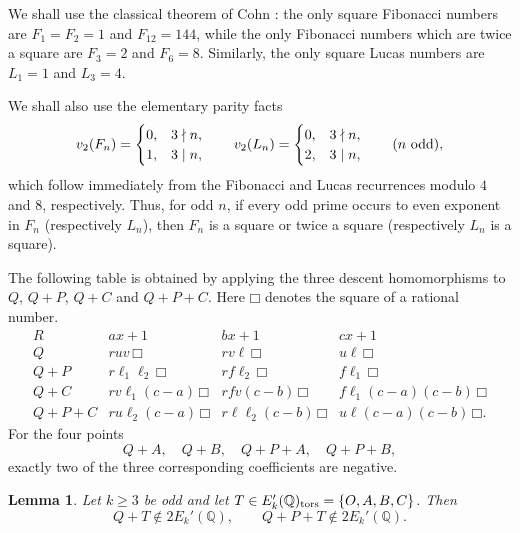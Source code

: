 \documentclass[11pt]{amsart}
\newtheorem{lemma}[theorem]{Lemma}
\theoremstyle{remark}
\newcommand{\Q}{\mathbb{Q}}
\newcommand{\sq}{\mathord{\Box}}
\begin{document}
We shall use the classical theorem of Cohn \cite{Cohn}: the only square
Fibonacci numbers are $F_1=F_2=1$ and $F_{12}=144$, while the only
Fibonacci numbers which are twice a square are $F_3=2$ and $F_6=8$.
Similarly, the only square Lucas numbers are $L_1=1$ and $L_3=4$.

We shall also use the elementary parity facts
\begin{equation}\label{2adic}
 v_2(F_n)=
 \begin{cases}
 0,&3\nmid n,\\
 1,&3\mid n,
 \end{cases}
 \qquad
 v_2(L_n)=
 \begin{cases}
 0,&3\nmid n,\\
 2,&3\mid n,
 \end{cases}
 \qquad (n\ {\rm odd}),
\end{equation}
which follow immediately from the Fibonacci and Lucas recurrences modulo
$4$ and $8$, respectively.  Thus, for odd $n$, if every odd prime occurs
to even exponent in $F_n$ (respectively $L_n$), then $F_n$ is a square
or twice a square (respectively $L_n$ is a square).

The following table is obtained by applying the three descent
homomorphisms to $Q$, $Q+P$, $Q+C$ and $Q+P+C$.  Here $\sq$ denotes
the square of a rational number.
\begin{equation}\label{table}
\begin{array}{c|ccc}
R& ax+1&bx+1&cx+1\\ \hline
Q&
ruv\,\sq&
rv\ell\,\sq&
u\ell\,\sq\\[1mm]
Q+P&
r\ell_1\ell_2\,\sq&
rf\ell_2\,\sq&
f\ell_1\,\sq\\[1mm]
Q+C&
rv\ell_1(c-a)\,\sq&
rfv(c-b)\,\sq&
f\ell_1(c-a)(c-b)\,\sq\\[1mm]
Q+P+C&
ru\ell_2(c-a)\,\sq&
r\ell\ell_2(c-b)\,\sq&
u\ell(c-a)(c-b)\,\sq .
\end{array}
\end{equation}
For the four points
\[
 Q+A,\quad Q+B,\quad Q+P+A,\quad Q+P+B,
\]
exactly two of the three corresponding coefficients are negative.

\begin{lemma}\label{newclasses}
Let $k\geq3$ be odd and let
$T\in E_k'(\Q)_{\rm tors}=\{O,A,B,C\}$. Then
\[
 Q+T\notin2E_k'(\Q),\qquad Q+P+T\notin2E_k'(\Q).
\]
\end{lemma}
\end{document}
